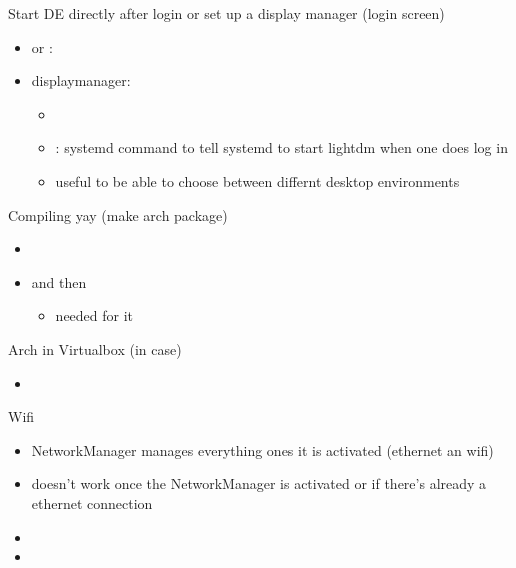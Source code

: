 \begin{frame}[fragile]{Start DE directly after login or set up a display manager (login screen)}
  \begin{itemize}
    \item {} or :
    \item \alert{displaymanager:}
      \begin{itemize}
        \item {}
        \item {}: systemd command to tell systemd to start lightdm when one does log in
        \item useful to be able to choose between differnt desktop environments
      \end{itemize}
  \end{itemize}
\end{frame}

\begin{frame}[fragile]{Compiling yay (make arch package)}
  \begin{itemize}
    \item {}
    \item {} and then 
      \begin{itemize}
        \item {} needed for it
      \end{itemize}
  \end{itemize}
\end{frame}

\begin{frame}[fragile]{Arch in Virtualbox (in case)}
  \begin{itemize}
    \item {}
  \end{itemize}
\end{frame}

\begin{frame}[fragile]{Wifi}
  \begin{itemize}
    \item NetworkManager manages everything ones it is activated (ethernet an wifi)
      \item {} doesn't work once the NetworkManager is activated or if there's already a ethernet connection
    \item {}
    \item {\tiny {}}
  \end{itemize}
\end{frame}

